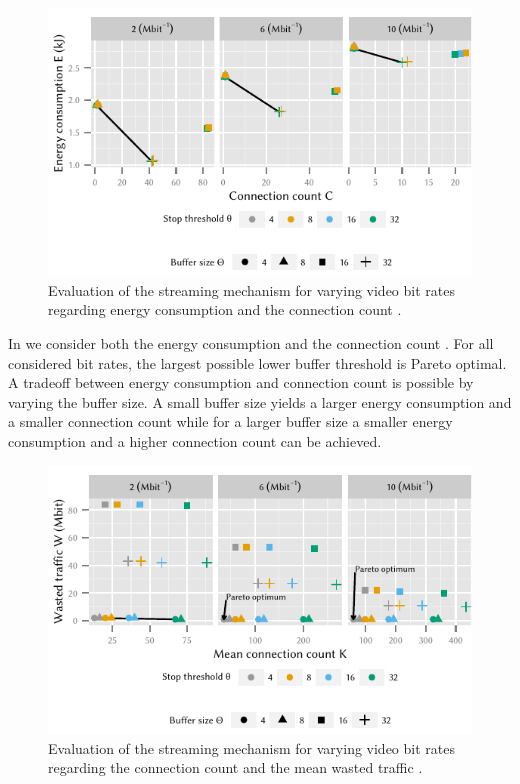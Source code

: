 \begin{figure}
  \centering
  \includegraphics{application/lte_video/trade_offs/figures/energy2connections}
  \caption{Evaluation of the streaming mechanism for varying video bit rates \bitrate regarding energy consumption \energyconsumption and the connection count \connectioncount.}
  \label{fig:application:lte_video:numerical_evaluation:trade_offs:energy2connections}
\end{figure}

In  we consider both the energy consumption \energyconsumption and the connection count \connectioncount.
For all considered bit rates, the largest possible lower buffer threshold is Pareto optimal.
A tradeoff between energy consumption \energyconsumption and connection count \connectioncount is possible by varying the buffer size.
A small buffer size yields a larger energy consumption \energyconsumption and a smaller connection count \connectioncount while for a larger buffer size a smaller energy consumption \energyconsumption and a higher connection count \connectioncount can be achieved.

\begin{figure}
  \centering
  \includegraphics{application/lte_video/trade_offs/figures/connections2lostData}
  \caption{Evaluation of the streaming mechanism for varying video bit rates \bitrate regarding the connection count \connectioncount and the mean wasted traffic \meanwastedtraffic.}
  \label{fig:application:lte_video:numerical_evaluation:trade_offs:connections2lostData}
\end{figure}

